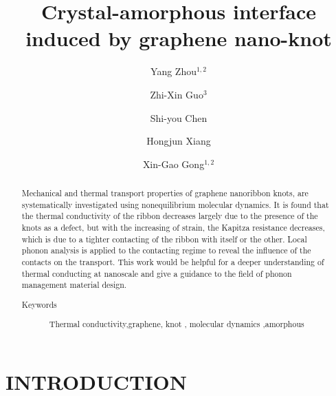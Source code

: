 \documentclass[%
 reprint,
 amsmath,amssymb,
 aps,
prb,
]{revtex4-1}
\begin{document}
\title{Crystal-amorphous interface induced by graphene nano-knot}
\author{Yang Zhou${}^{1,2}$}
\author{Zhi-Xin Guo${}^{3}$}
\author{Shi-you Chen}
\author{Hongjun Xiang}
\author{Xin-Gao Gong${}^{1,2}$}
%
\begin{abstract}
  Mechanical and thermal transport properties of graphene nanoribbon knots, are systematically investigated using nonequilibrium molecular dynamics. It is found that the thermal conductivity of the ribbon decreases largely due to the presence of the knots as a defect, but with the increasing of strain, the Kapitza resistance decreases, which is due to a tighter contacting of the ribbon with itself or the other. Local phonon analysis is applied to the contacting regime to reveal the influence of the contacts on the transport. This work would be helpful for a deeper understanding of thermal conducting at nanoscale and give a guidance to the field of phonon management material design.
  \begin{description}
    \item[Keywords]
          Thermal conductivity,graphene, knot , molecular dynamics ,amorphous
  \end{description}
\end{abstract}

\maketitle

\section{INTRODUCTION}
\end{document}
